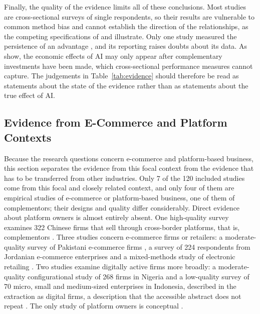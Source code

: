 Finally, the quality of the evidence limits all of these conclusions. Most studies are cross-sectional surveys of single respondents, so their results are vulnerable to common method bias \parencite{podsakoff2024} and cannot establish the direction of the relationships, as the competing specifications of \textcite{deng2025} and \textcite{quoc2026} illustrate. Only one study measured the persistence of an advantage \parencite{dzreke2025}, and its reporting raises doubts about its data. As \textcite{brynjolfsson2021} show, the economic effects of AI may only appear after complementary investments have been made, which cross-sectional performance measures cannot capture. The judgements in Table~\ref{tab:evidence} should therefore be read as statements about the state of the evidence rather than as statements about the true effect of AI.

\subsection{Evidence from E-Commerce and Platform Contexts}
\label{sec:focal}

Because the research questions concern e-commerce and platform-based business, this section separates the evidence from this focal context from the evidence that has to be transferred from other industries. Only 7 of the 120 included studies come from this focal and closely related context, and only four of them are empirical studies of e-commerce or platform-based business, one of them of complementors; their designs and quality differ considerably. Direct evidence about platform owners is almost entirely absent. One high-quality survey examines 322 Chinese firms that sell through cross-border platforms, that is, complementors \parencite{guo2025}. Three studies concern e-commerce firms or retailers: a moderate-quality survey of Pakistani e-commerce firms \parencite{noor2026}, a survey of 224 respondents from Jordanian e-commerce enterprises \parencite{awamleh2022} and a mixed-methods study of electronic retailing \parencite{bunea2026}. Two studies examine digitally active firms more broadly: a moderate-quality configurational study of 268 firms in Nigeria \parencite{adamu2026} and a low-quality survey of 70 micro, small and medium-sized enterprises in Indonesia, described in the extraction as digital firms, a description that the accessible abstract does not repeat \parencite{firmansyah2025}. The only study of platform owners is conceptual \parencite{dzreke2025b}.

